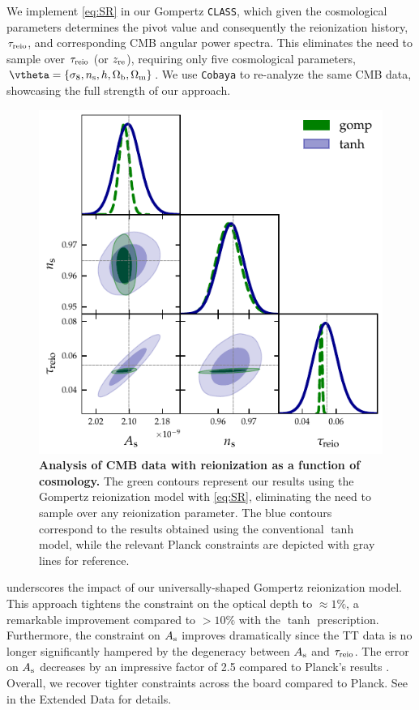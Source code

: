 We implement \cref{eq:SR} in our Gompertz \texttt{CLASS}, which given
the cosmological parameters determines the pivot value and consequently
the reionization history, $\tau_{\mathrm{reio}}$, and corresponding CMB angular
power spectra.
This eliminates the need to sample over $\tau_{\mathrm{reio}}$ (or $z_{\mathrm{re}}$),
requiring only five cosmological parameters, $\vtheta = \{ \sigma_8,
\ns, h, \Omegab, \Omegam\}$.
We use \texttt{Cobaya} to re-analyze the same CMB data,
showcasing the full strength of our approach.

\begin{figure}[tb]
\centering
\includegraphics[width=0.7\linewidth]{figs/gomp_tanh_triangle_kill.pdf}
\caption{\textbf{Analysis of CMB data with reionization as a function of
cosmology.}
The green contours represent our results using the Gompertz reionization
model with \cref{eq:SR}, eliminating the need to sample over any
reionization parameter.
The blue contours correspond to the results obtained using the
conventional $\tanh$ model, while the relevant Planck constraints
\cite{Planck2020a} are depicted with gray lines for reference.}
\label{fig:kill}
\end{figure}

 underscores the impact of our universally-shaped
Gompertz reionization model. This approach tightens the constraint on the optical depth to $\approx
1\%$, a remarkable improvement compared to $> 10\%$ with the $\tanh$
prescription.
Furthermore, the constraint on $A_\mathrm{s}$ improves dramatically since the TT
data is no longer significantly hampered by the degeneracy between $A_\mathrm{s}$
and $\tau_{\mathrm{reio}}$.
The error on $A_\mathrm{s}$ decreases by an impressive factor of 2.5 compared to
Planck's results \cite{Planck2020a}.
Overall, we recover tighter constraints across the board compared to
Planck.
See  in the Extended Data for details.


